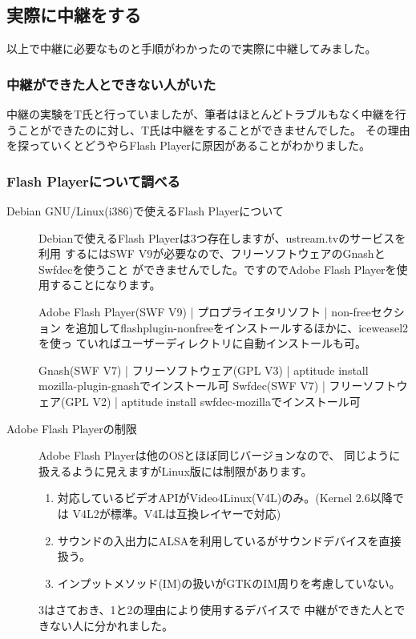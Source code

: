 \documentclass[mingoth,a4paper]{jsarticle}
\begin{document}
\subsection{実際に中継をする}

以上で中継に必要なものと手順がわかったので実際に中継してみました。

\subsubsection{中継ができた人とできない人がいた}

中継の実験をT氏と行っていましたが、筆者はほとんどトラブルもなく中継を行
うことができたのに対し、T氏は中継をすることができませんでした。
その理由を探っていくとどうやらFlash Playerに原因があることがわかりました。

\subsubsection{Flash Playerについて調べる}

\begin{description}
 \item[Debian GNU/Linux(i386)で使えるFlash Playerについて]

Debianで使えるFlash Playerは3つ存在しますが、ustream.tvのサービスを利用
するにはSWF V9が必要なので、フリーソフトウェアのGnashとSwfdecを使うこと
ができませんでした。ですのでAdobe Flash Playerを使用することになります。

Adobe Flash Player(SWF V9) | プロプライエタリソフト | non-freeセクション
を追加してflashplugin-nonfreeをインストールするほかに、iceweasel2を使っ
ていればユーザーディレクトリに自動インストールも可。

Gnash(SWF V7) | フリーソフトウェア(GPL V3) | aptitude install mozilla-plugin-gnashでインストール可
Swfdec(SWF V7) | フリーソフトウェア(GPL V2) | aptitude install swfdec-mozillaでインストール可

 \item[Adobe Flash Playerの制限]

Adobe Flash Playerは他のOSとほぼ同じバージョンなので、
同じように扱えるように見えますがLinux版には制限があります。

\begin{enumerate}
 \item 対応しているビデオAPIがVideo4Linux(V4L)のみ。(Kernel 2.6以降では
       V4L2が標準。V4Lは互換レイヤーで対応)
 \item サウンドの入出力にALSAを利用しているがサウンドデバイスを直接扱う。
 \item インプットメソッド(IM)の扱いがGTKのIM周りを考慮していない。
\end{enumerate}


3はさておき、1と2の理由により使用するデバイスで
中継ができた人とできない人に分かれました。

\end{description}
\end{document}

